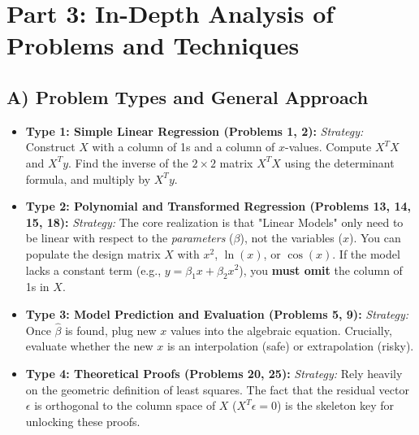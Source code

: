 \documentclass[11pt, letterpaper]{article}
\theoremstyle{definition}
\theoremstyle{remark}
\begin{document}
\newpage
\section{Part 3: In-Depth Analysis of Problems and Techniques}

\subsection{A) Problem Types and General Approach}
\begin{itemize}
    \item \textbf{Type 1: Simple Linear Regression (Problems 1, 2):} 
    \textit{Strategy:} Construct $X$ with a column of 1s and a column of $x$-values. Compute $X^T X$ and $X^T y$. Find the inverse of the $2 \times 2$ matrix $X^T X$ using the determinant formula, and multiply by $X^T y$.
    
    \item \textbf{Type 2: Polynomial and Transformed Regression (Problems 13, 14, 15, 18):} 
    \textit{Strategy:} The core realization is that "Linear Models" only need to be linear with respect to the \textit{parameters} ($\beta$), not the variables ($x$). You can populate the design matrix $X$ with $x^2$, $\ln(x)$, or $\cos(x)$. If the model lacks a constant term (e.g., $y = \beta_1 x + \beta_2 x^2$), you \textbf{must omit} the column of 1s in $X$.
    
    \item \textbf{Type 3: Model Prediction and Evaluation (Problems 5, 9):} 
    \textit{Strategy:} Once $\hat{\beta}$ is found, plug new $x$ values into the algebraic equation. Crucially, evaluate whether the new $x$ is an interpolation (safe) or extrapolation (risky).
    
    \item \textbf{Type 4: Theoretical Proofs (Problems 20, 25):} 
    \textit{Strategy:} Rely heavily on the geometric definition of least squares. The fact that the residual vector $\epsilon$ is orthogonal to the column space of $X$ ($X^T \epsilon = 0$) is the skeleton key for unlocking these proofs.
\end{itemize}
\end{document}
